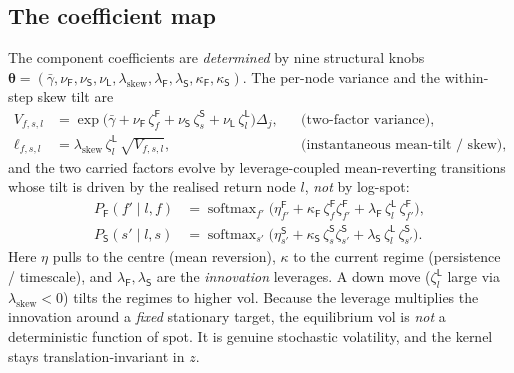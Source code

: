 \documentclass[11pt]{article}
\DeclareMathOperator{\softmax}{softmax}
\newcommand{\bth}{{\boldsymbol{\theta}}}
\begin{document}
\subsection{The coefficient map}
The component coefficients are \emph{determined} by nine structural knobs
$\bth=(\bar\gamma,\nu_{\mathsf{F}},\nu_{\mathsf{S}},\nu_{\mathsf{L}},\lambda_{\mathrm{skew}},\lambda_{\mathsf{F}},\lambda_{\mathsf{S}},\allowbreak
\kappa_{\mathsf{F}},\kappa_{\mathsf{S}})$. The per-node variance and the within-step skew tilt are
\begin{align}
V_{f,s,l}&=\exp\!\big(\bar\gamma+\nu_{\mathsf{F}}\,\zeta^{\mathsf{F}}_f+\nu_{\mathsf{S}}\,\zeta^{\mathsf{S}}_s+\nu_{\mathsf{L}}\,\zeta^{\mathsf{L}}_l\big)
  \Delta_j, &&\text{(two-factor variance)},\\
\ell_{f,s,l}&=\lambda_{\mathrm{skew}}\,\zeta^{\mathsf{L}}_l\,\sqrt{V_{f,s,l}},
  &&\text{(instantaneous mean-tilt / skew)},
\end{align}
and the two carried factors evolve by leverage-coupled mean-reverting transitions whose
tilt is driven by the realised return node $l$, \emph{not} by log-spot:
\begin{align}
P_{\mathsf{F}}(f'\mid l,f)&=\softmax_{f'}\!\big(\eta^{\mathsf{F}}_{f'}+\kappa_{\mathsf{F}}\,\zeta^{\mathsf{F}}_f\zeta^{\mathsf{F}}_{f'}
  +\lambda_{\mathsf{F}}\,\zeta^{\mathsf{L}}_l\,\zeta^{\mathsf{F}}_{f'}\big),\\
P_{\mathsf{S}}(s'\mid l,s)&=\softmax_{s'}\!\big(\eta^{\mathsf{S}}_{s'}+\kappa_{\mathsf{S}}\,\zeta^{\mathsf{S}}_s\zeta^{\mathsf{S}}_{s'}
  +\lambda_{\mathsf{S}}\,\zeta^{\mathsf{L}}_l\,\zeta^{\mathsf{S}}_{s'}\big).
\end{align}
Here $\eta$ pulls to the centre (mean reversion), $\kappa$ to the current regime
(persistence / timescale), and $\lambda_{\mathsf{F}},\lambda_{\mathsf{S}}$ are the \emph{innovation}
leverages. A down move ($\zeta^{\mathsf{L}}_l$ large via $\lambda_{\mathrm{skew}}<0$) tilts the
regimes to higher vol. Because the leverage multiplies the innovation around a
\emph{fixed} stationary target, the equilibrium vol is \emph{not} a deterministic
function of spot. It is genuine stochastic volatility, and the kernel stays
translation-invariant in $z$.
\end{document}
